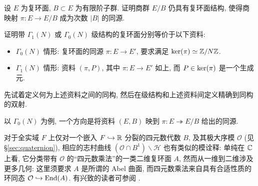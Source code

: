 \begin{exercise}
	设 $E$ 为复环面, $B \subset E$ 为有限阶子群. 证明商群 $E/B$ 仍具有复环面结构, 使得商映射 $\pi: E \to E/B$ 成为次数 $|B|$ 的同源.
\end{exercise}

\begin{exercise} 
	证明带 $\Gamma_1(N)$ 或 $\Gamma_0(N)$ 级结构的复环面分别等价于以下资料:
	\begin{itemize}
		\item $\Gamma_0(N)$ 情形: 复环面的同源 $\pi: E \to E'$, 要求满足 $\operatorname{ker}(\pi) \simeq \mathbb{Z}/N\mathbb{Z}$.
		\item $\Gamma_1(N)$ 情形: 资料 $(\pi, P)$, 其中 $\pi: E \to E'$ 如上, 而 $P \in \operatorname{ker}(\pi)$ 是一个生成元.
	\end{itemize}
	先试着定义何为上述资料之间的同构, 然后在级结构和上述资料间定义精确到同构的双射.
	
	\begin{hint}
		以 $\Gamma_0(N)$ 为例, 一个方向是将资料 $(E, B)$ 映到 $\pi: E \twoheadrightarrow E/B$ 给出的同源.
	\end{hint}
\end{exercise}

\begin{remark}
	对于全实域 $F$ 上仅对一个嵌入 $F \hookrightarrow \mathbb{R}$ 分裂的四元数代数 $B$, 及其极大序模 $\mathcal{O}$ (见 \S\ref{sec:quaternion}), 相应的志村曲线 $(\mathcal{O} \cap B^1) \backslash \mathcal{H}$ 也有类似的模诠释: 单纯在 $\mathbb{C}$ 上看, 它分类带有 $\mathcal{O}$ 的``四元数乘法''的一类二维复环面 $A$, 然而从一维到二维涉及更多几何: 这里须要求 $A$ 是所谓的 Abel 曲面, 而四元数乘法来自具有合适性质的环同态 $\mathcal{O} \hookrightarrow \operatorname{End}(A)$. 有兴致的读者可参阅 \cite[\S 43]{Voi}.
\end{remark}
